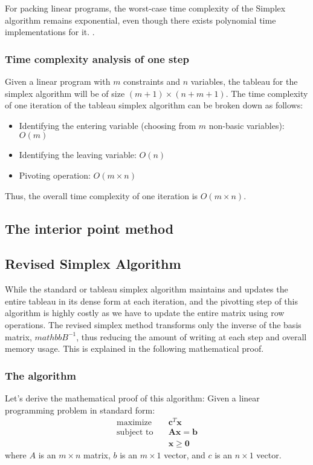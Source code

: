 For packing linear programs, the worst-case time complexity of the Simplex algorithm
remains exponential, even though there exists polynomial time implementations for it.
\parencite{stille2010solution}.

\subsubsection{Time complexity analysis of one step}
Given a linear program with \( m \) constraints and \( n \) variables, the tableau for the
 simplex algorithm will be of size \( (m+1) \times (n+m+1) \). 
 The time complexity of one iteration of the tableau simplex algorithm can be broken down as follows:

\begin{itemize}
    \item Identifying the entering variable (choosing from $m$ non-basic variables): \( O(m) \)
    \item Identifying the leaving variable: \( O(n) \)
    \item Pivoting operation: \( O(m \times n) \)
\end{itemize}

Thus, the overall time complexity of one iteration is \( O(m \times n) \).

\subsection{The interior point method}

\subsection{Revised Simplex Algorithm}
While the standard or tableau simplex algorithm maintains and updates the entire tableau in its
dense form at each iteration, and the pivotting step of this algorithm is
highly costly as we have to update the entire matrix
using row operations.
The revised simplex
method transforms only the inverse of the basis matrix, $mathbb{B}^{-1}$, thus
reducing the amount of writing at each step and overall memory usage.
This is explained in the following mathematical proof.

\subsubsection{The algorithm}
Let's derive the mathematical proof of this algorithm:
Given a linear programming problem in standard form:
\begin{align*}
    \text{maximize} \quad   & \mathbf{c}^T \mathbf{x}           \\
    \text{subject to} \quad & \mathbf{A}\mathbf{x} = \mathbf{b} \\
                            & \mathbf{x} \geq \mathbf{0}
\end{align*}
where \( A \) is an \( m \times n \) matrix,
\( b \) is an \( m \times 1 \) vector, and
\( c \) is an \( n \times 1 \) vector.


